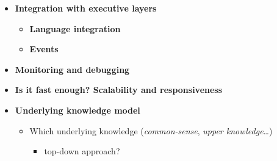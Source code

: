 \documentclass[a4paper]{article}
\begin{document}
\begin{itemize}
\begin{itemize}
        \item{\bf Integration with executive layers}

        \begin{itemize}
            \item{\bf Language integration}
            \item{\bf Events}
        \end{itemize}
        
        \item{\bf Monitoring and debugging}

        \item{\bf Is it fast enough? Scalability and responsiveness}
    \end{itemize}

\begin{itemize}
    \item{\bf Underlying knowledge model}

    \begin{itemize}
        \item  Which underlying knowledge (\emph{common-sense}, \emph{upper knowledge}\ldots{})
        \begin{itemize}
            \item  top-down approach?
        \end{itemize}

    \end{itemize}
\end{itemize}
\end{itemize}



\end{document}
